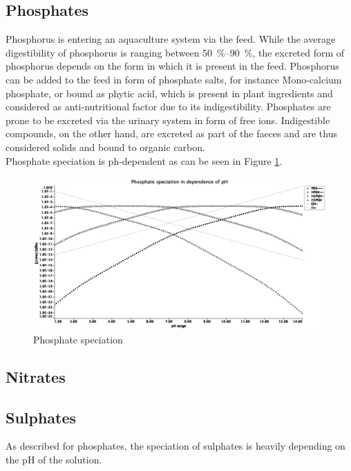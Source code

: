 \documentclass{scrartcl}
\begin{document}
\subsection{Phosphates}
Phosphorus is entering an aquaculture system via the feed. While the average digestibility of phosphorus is ranging between \SIrange{50}{90}{\percent}, the excreted form of phosphorus depends on the form in which it is present in the feed. Phosphorus can be added to the feed in form of phosphate salts, for instance Mono-calcium phosphate, or bound as phytic acid, which is present in plant ingredients and considered as anti-nutritional factor due to its indigestibility. Phosphates are prone to be excreted via the urinary system in form of free ions. Indigestible compounds, on the other hand, are excreted as part of the faeces and are thus considered solids and bound to organic carbon.\\
Phosphate speciation is ph-dependent as can be seen in Figure \ref{fig:phosphate}.
%
\begin{figure}
	\includegraphics[scale=0.35]{plots/log_phosphates.jpg}
	\caption{Phosphate speciation}
	\label{fig:phosphate}
\end{figure}
%
%
%
\subsection{Nitrates}
%
%
%
\subsection{Sulphates}
As described for phosphates, the speciation of sulphates is heavily depending on the pH of the solution.
%
%
%
\end{document}
